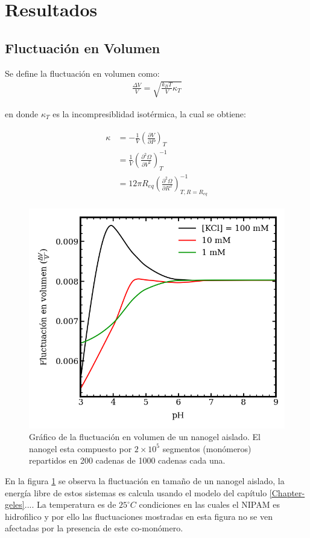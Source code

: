 \section{Resultados}


\subsection{Fluctuaci\'on en Volumen}
Se define la fluctuaci\'on en volumen como:
\begin{align}
	\frac{\Delta V}{V} = \sqrt{\frac{k_BT}{V}\kappa_T}
\end{align}

\noindent en donde $\kappa_T$ es la incompresiblidad isot\'ermica, la cual se obtiene:

\begin{align}
	\begin{aligned}
		\kappa & = -\frac{1}{V} \left( \frac{\partial V}{\partial P}\right)_T \\
		& =\frac{1}{V} \left( \frac{\partial^2 \Omega}{\partial V^2}\right)^{-1}_T \\
		& = 12 \pi R_{eq} \left( \frac{\partial^2 \Omega}{\partial R^2}\right)^{-1}_{T,R=R_{eq}}
	\end{aligned}
\end{align}



\begin{figure}[!tb]
	\centering
	\includegraphics[width=0.45\linewidth]{Figures/graph-mc/dvv.png}
	\caption{Gr\'afico de la fluctuaci\'on en volumen de un nanogel aislado. El nanogel esta compuesto por $2\times 10^5$ segmentos (mon\'omeros) repartidos en 200 cadenas de 1000 cadenas cada una.}
	\label{fig:mc:dvvi}
\end{figure}
En la figura \ref{fig:mc:dvvi} se observa la fluctuaci\'on en tama\~no de un nanogel aislado, la energ\'ia libre de estos sistemas es calcula usando el modelo del cap\'itulo \ref{Chapter-geles}....
La temperatura es de $25 ^\circ C$ condiciones en las cuales el NIPAM es hidrofilico y por ello las fluctuaciones mostradas en esta figura no se ven afectadas por la presencia de este co-mon\'omero.

